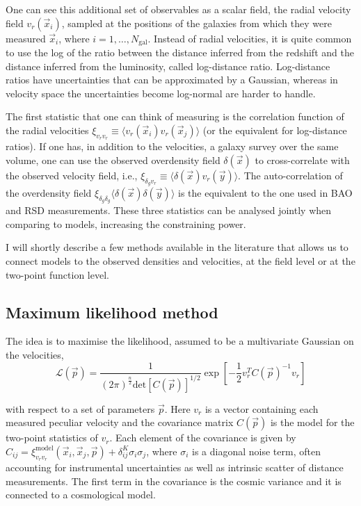 One can see this additional set of observables as a scalar field, the radial 
velocity field  $v_r(\vec{x}_i)$, sampled 
at the positions of the galaxies from which they were measured $\vec{x}_i$, 
where $i=1,\ldots,N_\text{gal}$. 
Instead of radial velocities, it is quite common to use the log of the ratio between the distance inferred from 
the redshift and the distance inferred from the luminosity, called log-distance ratio. 
Log-distance ratios have uncertainties that can be approximated by a Gaussian, 
whereas in velocity space the uncertainties become log-normal are harder to handle. 

The first statistic that one can think of measuring is the correlation function of the 
radial velocities  $\xi_{v_r v_r} \equiv \langle v_r(\vec{x}_i) v_r(\vec{x}_j) \rangle$ 
(or the equivalent for log-distance ratios). 
If one has, in addition to the velocities, a galaxy survey over the same volume, one
can use the observed overdensity field $\delta(\vec{x})$ to cross-correlate with the 
observed velocity field, i.e., $\xi_{\delta_g v_r} \equiv \langle \delta(\vec{x}) v_r(\vec{y})\rangle$. 
The auto-correlation of the overdensity field $\xi_{\delta_g \delta_g} \langle \delta(\vec{x})\delta(\vec{y})\rangle$ 
is the equivalent to the one used in BAO and RSD measurements. 
These three statistics can be analysed jointly when comparing to models, 
increasing the constraining power. 

I will shortly describe a few methods available in the literature that 
allows us to connect models to the observed densities and velocities, 
at the field level or at the two-point function level. 

    \subsection{Maximum likelihood method}
    \label{velocities:methods:maximum_likelihood}

    The idea is to maximise the likelihood, assumed to be a multivariate Gaussian on 
    the velocities,
    \begin{equation}
        \mathcal{L}(\vec{p}) = \frac{1}{(2 \pi)^{\frac{n}{2}} \text{det}[C(\vec{p})]^{1/2} }
            \exp\left[-\frac{1}{2} v_r^T C(\vec{p})^{-1} v_r\right]
        \label{eq:likelihood}
    \end{equation}

    with respect to a set of parameters $\vec{p}$. Here $v_r$ is a vector containing each 
    measured peculiar velocity and the covariance matrix $C(\vec{p})$ is the model 
    for the two-point statistics of $v_r$. Each element of the covariance is given by 
    $C_{ij} =  \xi^\text{model}_{v_r v_r}(\vec{x}_i, \vec{x}_j, \vec{p}) + \delta^K_{ij} \sigma_i \sigma_j$, 
    where $\sigma_i$ is a diagonal noise term, often accounting for instrumental uncertainties 
    as well as intrinsic scatter of distance measurements. 
    The first term in the covariance 
    is the cosmic variance and it is connected to a cosmological model. 

